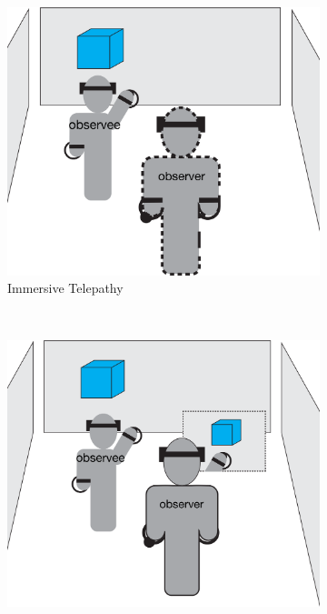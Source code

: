 \documentclass[chi_draft]{sigchi}
\begin{document}
\begin{figure}
    \centering
    \begin{subfigure}[b]{0.4\columnwidth}
        \includegraphics[width=1\columnwidth]{immersiveObservation.png}
        \caption{Immersive Telepathy}
        \label{fig:observeI}
    \end{subfigure}
    ~ %
    \begin{subfigure}[b]{0.4\columnwidth}
        \includegraphics[width=1\columnwidth]{windowObservation.png}

\end{subfigure}
\end{figure}
\end{document}
